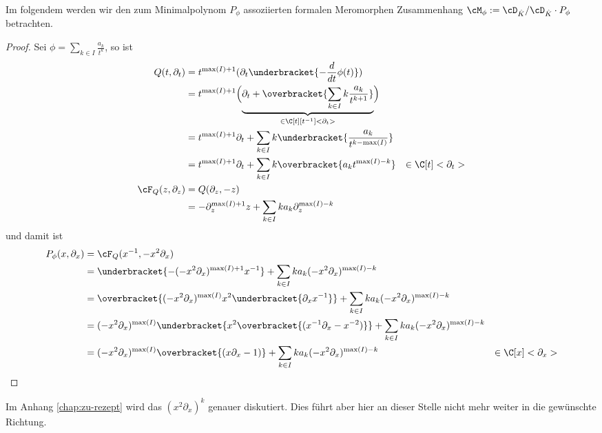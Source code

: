 Im folgendem werden wir den zum Minimalpolynom $P_\phi$ assoziierten formalen
Meromorphen Zusammenhang $\cM_\phi:=\cD_{\hat K}/\cD_{\hat K}\cdot P_{\phi}$
betrachten.

\begin{lem}
Zu einem $\phi=\sum_{k\in I}\frac{a_k}{t^{k}}\in {\phi=\sum_{k\in
I}\frac{a_k}{t^{k}}|I\subset\N\mbox{ endlich} ,a_k\in \C\}$ ist das
Minimalpolynom von $\cM_\phi$ explizit gegeben durch
\begin{align*}
P_{\phi}(x,\partial_x) &=(-x^2\partial_x)^{\max(I)} (x\partial_x-1)
   +\sum_{k\in I}k a_k(-x^2\partial_x)^{\max(I)-k} & \in \C[x]<\partial_x>
\end{align*}
\end{lem}
\begin{proof}
Sei $\phi=\sum_{k\in I}\frac{a_k}{t^{k}}$, so ist
\begin{align*}
Q(t,\partial_t) &= t^{\max(I)+1}(\partial_t\underbracket{-\frac{d}{dt}\phi(t)})
\\&=t^{\max(I)+1}\Big(\underset{\in \C[t][t^{-1}]<\partial_t>}{\underbrace{
    \partial_t+\overbracket{\sum_{k\in I} k\frac{a_k}{t^{k+1}}}}}\Big)
\\&=t^{\max(I)+1}\partial_t
  + \sum_{k\in I} k\underbracket{\frac{a_k}{t^{k-\max(I)}}}
\\&=t^{\max(I)+1}\partial_t +\sum_{k\in I}k \overbracket{a_k t^{\max(I)-k}}
  & \in \C[t]<\partial_t>
\\\cF_Q(z,\partial_z) &=Q(\partial_z,-z)
\\&=-\partial_z^{\max(I)+1}z +\sum_{k\in I}k a_k\partial_z^{\max(I)-k}
\end{align*}
und damit ist
\begin{align*}
P_{\phi}(x,\partial_x) &=\cF_Q(x^{-1},-x^2\partial_x)
\\&=\underbracket{-(-x^2\partial_x)^{\max(I)+1}x^{-1}}
  +\sum_{k\in I}k a_k(-x^2\partial_x)^{\max(I)-k}
\\&=\overbracket{(-x^2\partial_x)^{\max(I)} x^2\underbracket{\partial_xx^{-1}}}
   +\sum_{k\in I}k a_k(-x^2\partial_x)^{\max(I)-k}
\\&=(-x^2\partial_x)^{\max(I)}
   \underbracket{ x^2 \overbracket{(x^{-1}\partial_x-x^{-2})} }
   +\sum_{k\in I}k a_k(-x^2\partial_x)^{\max(I)-k}
\\&=(-x^2\partial_x)^{\max(I)} \overbracket{(x\partial_x-1)}
   +\sum_{k\in I}k a_k(-x^2\partial_x)^{\max(I)-k}
  & \in \C[x]<\partial_x>
\end{align*}
\end{proof}
Im Anhang \ref{chap:zu-rezept} wird das $(x^2\partial_x)^{k}$ genauer
diskutiert. Dies führt aber hier an dieser Stelle nicht mehr weiter in die
gewünschte Richtung.

